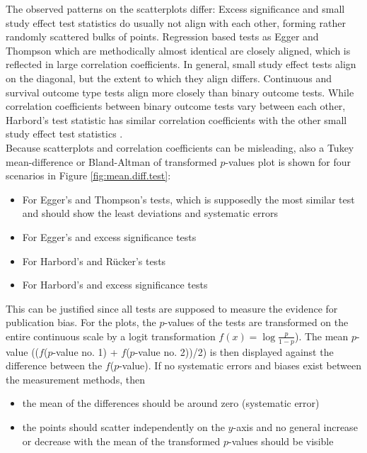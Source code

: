 The observed patterns on the scatterplots differ: Excess significance and small study effect test statistics do usually not align with each other, forming rather randomly scattered bulks of points. Regression based tests as Egger and Thompson which are methodically almost identical are closely aligned, which is reflected in large correlation coefficients. In general, small study effect tests align on the diagonal, but the extent to which they align differs. Continuous and survival outcome type tests align more closely than binary outcome tests. While correlation coefficients between binary outcome tests vary between each other, Harbord's test statistic has similar correlation coefficients with the other small study effect test statistics .\\
Because scatterplots and correlation coefficients can be misleading, also a Tukey mean-difference or Bland-Altman of transformed $p$-values plot is shown for four scenarios in Figure \ref{fig:mean.diff.test}:
\begin{itemize}
\item For Egger's and Thompson's tests, which is supposedly the most similar test and should show the least deviations and systematic errors
\item For Egger's and excess significance tests
\item For Harbord's and R\"ucker's tests
\item For Harbord's and excess significance tests
\end{itemize}

This can be justified since all tests are supposed to measure the evidence for publication bias. For the plots, the $p$-values of the tests are transformed on the entire continuous scale by a logit transformation $f(x)  = \log\frac{p}{1-p}$). The mean $p$-value (($f$($p$-value no. 1) + $f$($p$-value no. 2))/2) is then displayed against the difference between the $f$($p$-value). If no systematic errors and biases exist between the measurement methods, then 

\begin{itemize}
\item the mean of the differences should be around zero (systematic error) 
\item the points should scatter independently on the $y$-axis and no general increase or decrease with the mean of the transformed $p$-values should be visible
\end{itemize}

